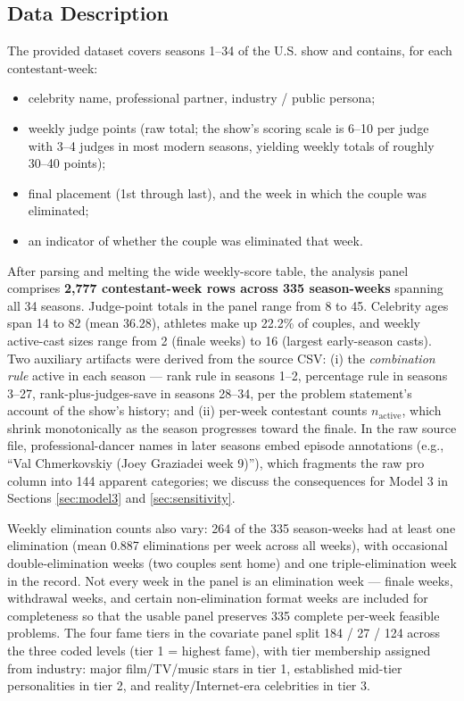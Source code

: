 \documentclass{article}
\begin{document}
\subsection{Data Description}

The provided dataset covers seasons 1--34 of the U.S. show and contains, for each contestant-week:
\begin{itemize}
  \item celebrity name, professional partner, industry / public persona;
  \item weekly judge points (raw total; the show's scoring scale is 6--10 per judge with 3--4 judges in most modern seasons, yielding weekly totals of roughly 30--40 points);
  \item final placement (1st through last), and the week in which the couple was eliminated;
  \item an indicator of whether the couple was eliminated that week.
\end{itemize}
After parsing and melting the wide weekly-score table, the analysis panel comprises \textbf{2{,}777 contestant-week rows across 335 season-weeks} spanning all 34 seasons. Judge-point totals in the panel range from 8 to 45. Celebrity ages span 14 to 82 (mean 36.28), athletes make up 22.2\% of couples, and weekly active-cast sizes range from 2 (finale weeks) to 16 (largest early-season casts). Two auxiliary artifacts were derived from the source CSV: (i) the \emph{combination rule} active in each season --- rank rule in seasons 1--2, percentage rule in seasons 3--27, rank-plus-judges-save in seasons 28--34, per the problem statement's account of the show's history; and (ii) per-week contestant counts $n_{\text{active}}$, which shrink monotonically as the season progresses toward the finale. In the raw source file, professional-dancer names in later seasons embed episode annotations (e.g., ``Val Chmerkovskiy (Joey Graziadei week 9)''), which fragments the raw pro column into 144 apparent categories; we discuss the consequences for Model 3 in Sections \ref{sec:model3} and \ref{sec:sensitivity}.

Weekly elimination counts also vary: 264 of the 335 season-weeks had at least one elimination (mean 0.887 eliminations per week across all weeks), with occasional double-elimination weeks (two couples sent home) and one triple-elimination week in the record. Not every week in the panel is an elimination week --- finale weeks, withdrawal weeks, and certain non-elimination format weeks are included for completeness so that the usable panel preserves 335 complete per-week feasible problems. The four fame tiers in the covariate panel split 184 / 27 / 124 across the three coded levels (tier 1 = highest fame), with tier membership assigned from industry: major film/TV/music stars in tier 1, established mid-tier personalities in tier 2, and reality/Internet-era celebrities in tier 3.
\end{document}
